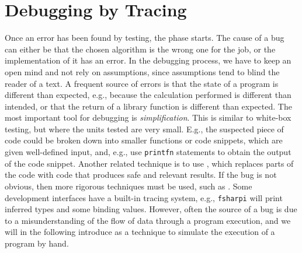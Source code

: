 \documentclass[fsharpnotes.tex]{subfiles}
\begin{document}
\begin{comment}
  http://www.scientificamerican.com/article/pogue-5-most-embarrassing-software-bugs-in-history/, 5 Most Embarrassing Software Bugs in History

  http://royal.pingdom.com/2009/03/19/10-historical-software-bugs-with-extreme-consequences/

  https://raygun.com/blog/2014/05/10-costly-software-errors-history/

  http://www.computerworld.com/article/2515483/enterprise-applications/epic-failures--11-infamous-software-bugs.html

  http://catless.ncl.ac.uk/Risks/20.59.html#subj1

  https://en.wikipedia.org/wiki/List_of_software_bugs

  December 19, 1991; ISO/IEC 9126, the international standard for the evaluation of software quality, replaced by ISO/IEC 25010:2011. Not publicly available, \footnote{A review of the ISO/IEC 9126 is given in \url{http://www.sqa.net/iso9126.html}. A brief review of ISO/IEC 25010:2011 is given in }
\end{comment}

\section{Debugging by Tracing}
Once an error has been found by testing, the  phase starts. The cause of a bug can either be that the chosen algorithm is the wrong one for the job, or the implementation of it has an error. In the debugging process, we have to keep an open mind and not rely on assumptions, since assumptions tend to blind the reader of a text. A frequent source of errors is that the state of a program is different than expected, e.g., because the calculation performed is different than intended, or that the return of a library function is different than expected. The most important tool for debugging is \emph{simplification}. This is similar to white-box testing, but where the units tested are very small. E.g., the suspected piece of code could be broken down into smaller functions or code snippets, which are given well-defined input, and, e.g., use \lstinline!printfn! statements to obtain the output of the code snippet. Another related technique is to use , which replaces parts of the code with code that produces safe and relevant results. If the bug is not obvious, then more rigorous techniques must be used, such as . Some development interfaces have a built-in tracing system, e.g., \lstinline[language=console]{fsharpi} will print inferred types and some binding values. However, often the source of a bug is due to a misunderstanding of the flow of data through a program execution, and we will in the following introduce  as a technique to simulate the execution of a program by hand.
\end{document}
